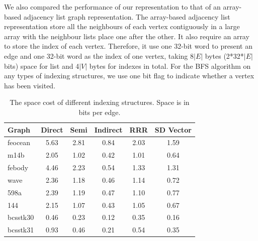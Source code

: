\documentclass[12pt,glossary]{dalthesis}
\begin{document}
\bigskip
\bigskip

We also compared the performance of our representation to that of an array-based adjacency list graph representation. The array-based adjacency list representation store all the neighbours of each vertex contiguously in a large array with the neighbour lists place one after the other. It also require an array to store the index of each vertex. Therefore, it use one 32-bit word to present an edge and one 32-bit word as the index of one vertex, taking 8$|E|$ bytes (2*32*$|E|$ bits) space for list and 4$|V|$ bytes for indexes in total. For the BFS algorithm on any types of indexing structures, we use one bit flag to indicate whether a vertex has been visited.
\bigskip     

\begin{table}[ht]
\centering
\caption{The space cost of different indexing structures. Space is in bits per edge.}
\label{my-label}
\begin{tabular}{|l||c||c||c||c||c|}
\hline
Graph    & Direct & Semi & Indirect & RRR & SD Vector \\ \hline
feocean  &    5.63    &   2.81   &     0.84     &  2.03   &   1.59        \\
m14b     &    2.05    &   1.02   &    0.42      &  1.01   &   0.64        \\
febody   &    4.46   &   2.23   &     0.54     &  1.33   &    1.31        \\
wave     &   2.36    &   1.18   &    0.46      &   1.14   &   0.72         \\
598a     &    2.39    &   1.19   &   0.47       &  1.10   &    0.77       \\
144      &    2.15   &   1.07   &    0.43      &  1.05    &   0.67          \\
bcsstk30 &   0.46   &   0.23   &      0.12    &   0.35   &   0.16        \\
bcsstk31 &   0.93   &   0.46   &     0.21     &  0.54   &   0.35        \\ \hline
\end{tabular}
\end{table}

\bigskip
\end{document}
